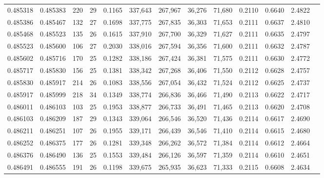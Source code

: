 \begin{tabular}{rrrrrrrrrrrrr}
0.485318 & 0.485383 & 220 &  29 &                                     0.1165 & 337,643 & 267,967 &  36,276 &  71,680 & 0.2110 & 0.6640 & 2.4822 \\
0.485386 & 0.485467 & 132 &  27 &                                     0.1698 & 337,775 & 267,835 &  36,303 &  71,653 & 0.2111 & 0.6637 & 2.4810 \\
0.485468 & 0.485523 & 135 &  26 &                                     0.1615 & 337,910 & 267,700 &  36,329 &  71,627 & 0.2111 & 0.6635 & 2.4797 \\
0.485523 & 0.485600 & 106 &  27 &                                     0.2030 & 338,016 & 267,594 &  36,356 &  71,600 & 0.2111 & 0.6632 & 2.4787 \\
0.485602 & 0.485716 & 170 &  25 &                                     0.1282 & 338,186 & 267,424 &  36,381 &  71,575 & 0.2111 & 0.6630 & 2.4772 \\
0.485717 & 0.485830 & 156 &  25 &                                     0.1381 & 338,342 & 267,268 &  36,406 &  71,550 & 0.2112 & 0.6628 & 2.4757 \\
0.485830 & 0.485917 & 214 &  26 &                                     0.1083 & 338,556 & 267,054 &  36,432 &  71,524 & 0.2112 & 0.6625 & 2.4737 \\
0.485917 & 0.485999 & 218 &  34 &                                     0.1349 & 338,774 & 266,836 &  36,466 &  71,490 & 0.2113 & 0.6622 & 2.4717 \\
0.486011 & 0.486103 & 103 &  25 &                                     0.1953 & 338,877 & 266,733 &  36,491 &  71,465 & 0.2113 & 0.6620 & 2.4708 \\
0.486103 & 0.486209 & 187 &  29 &                                     0.1343 & 339,064 & 266,546 &  36,520 &  71,436 & 0.2114 & 0.6617 & 2.4690 \\
0.486211 & 0.486251 & 107 &  26 &                                     0.1955 & 339,171 & 266,439 &  36,546 &  71,410 & 0.2114 & 0.6615 & 2.4680 \\
0.486252 & 0.486375 & 177 &  26 &                                     0.1281 & 339,348 & 266,262 &  36,572 &  71,384 & 0.2114 & 0.6612 & 2.4664 \\
0.486376 & 0.486490 & 136 &  25 &                                     0.1553 & 339,484 & 266,126 &  36,597 &  71,359 & 0.2114 & 0.6610 & 2.4651 \\
0.486491 & 0.486555 & 191 &  26 &                                     0.1198 & 339,675 & 265,935 &  36,623 &  71,333 & 0.2115 & 0.6608 & 2.4634 \\

\end{tabular}
